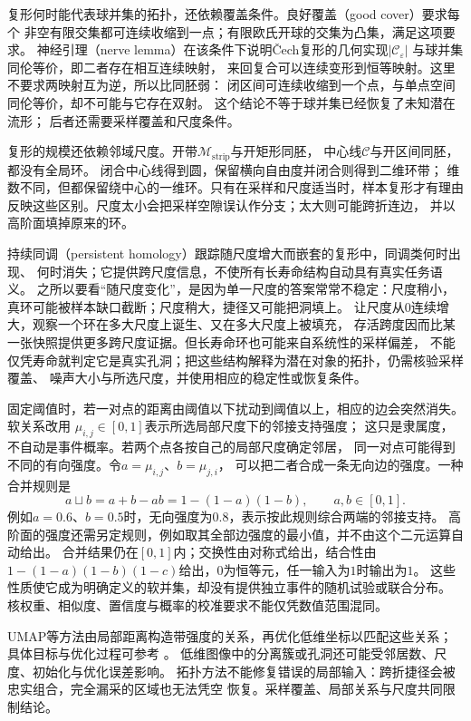 复形何时能代表球并集的拓扑，还依赖覆盖条件。良好覆盖（good cover）要求每个
非空有限交集都可连续收缩到一点；有限欧氏开球的交集为凸集，满足这项要求。
神经引理（nerve lemma）在该条件下说明Čech复形的几何实现$|\mathcal C_\varepsilon|$
与球并集同伦等价，即二者存在相互连续映射，
来回复合可以连续变形到恒等映射。这里不要求两映射互为逆，所以比同胚弱：
闭区间可连续收缩到一个点，与单点空间同伦等价，却不可能与它存在双射。
这个结论不等于球并集已经恢复了未知潜在流形；
后者还需要采样覆盖和尺度条件。


复形的规模还依赖邻域尺度。开带$\mathcal M_{\mathrm{strip}}$与开矩形同胚，
中心线$\mathcal C$与开区间同胚，都没有全局环。
闭合中心线得到圆，保留横向自由度并闭合则得到二维环带；
维数不同，但都保留绕中心的一维环。只有在采样和尺度适当时，样本复形才有理由
反映这些区别。尺度太小会把采样空隙误认作分支；太大则可能跨折连边，
并以高阶面填掉原来的环。

持续同调（persistent homology）跟踪随尺度增大而嵌套的复形中，同调类何时出现、
何时消失；它提供跨尺度信息，不使所有长寿命结构自动具有真实任务语义。
之所以要看“随尺度变化”，是因为单一尺度的答案常常不稳定：尺度稍小，
真环可能被样本缺口截断；尺度稍大，捷径又可能把洞填上。
让尺度从$0$连续增大，观察一个环在多大尺度上诞生、又在多大尺度上被填充，
存活跨度因而比某一张快照提供更多跨尺度证据。但长寿命环也可能来自系统性的采样偏差，
不能仅凭寿命就判定它是真实孔洞；把这些结构解释为潜在对象的拓扑，仍需核验采样覆盖、
噪声大小与所选尺度，并使用相应的稳定性或恢复条件。


固定阈值时，若一对点的距离由阈值以下扰动到阈值以上，相应的边会突然消失。软关系改用
$\mu_{i,j}\in[0,1]$表示所选局部尺度下的邻接支持强度；
这只是隶属度，不自动是事件概率。若两个点各按自己的局部尺度确定邻居，
同一对点可能得到不同的有向强度。令$a=\mu_{i,j}$、$b=\mu_{j,i}$，
可以把二者合成一条无向边的强度。一种合并规则是
\begin{equation}
 a\mathbin{\sqcup}b=a+b-ab=1-(1-a)(1-b),\qquad a,b\in[0,1].
 \label{eq:geometry-fuzzy-union}
\end{equation}
例如$a=0.6$、$b=0.5$时，无向强度为$0.8$，表示按此规则综合两端的邻接支持。
高阶面的强度还需另定规则，例如取其全部边强度的最小值，并不由这个二元运算自动给出。
合并结果仍在$[0,1]$内；交换性由对称式给出，结合性由
$1-(1-a)(1-b)(1-c)$给出，$0$为恒等元，任一输入为$1$时输出为$1$。
这些性质使它成为明确定义的软并集，却没有提供独立事件的随机试验或联合分布。
核权重、相似度、置信度与概率的校准要求不能仅凭数值范围混同。

UMAP等方法由局部距离构造带强度的关系，再优化低维坐标以匹配这些关系；
具体目标与优化过程可参考
。
低维图像中的分离簇或孔洞还可能受邻居数、尺度、初始化与优化误差影响。
拓扑方法不能修复错误的局部输入：跨折捷径会被忠实组合，完全漏采的区域也无法凭空
恢复。采样覆盖、局部关系与尺度共同限制结论。

